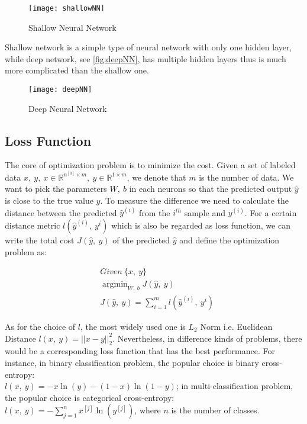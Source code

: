 \begin{figure}[H]
    \centering
    \texttt{[image: shallowNN]}
    \caption{\label{fig:shallowNN}Shallow Neural Network}
\end{figure}

Shallow network is a simple type of neural network with only one hidden layer, 
while deep network, see \autoref{fig:deepNN}, has multiple hidden layers thus is much more complicated than
the shallow one.

\begin{figure}[H]
    \centering
    \texttt{[image: deepNN]}
    \caption{\label{fig:deepNN}Deep Neural Network}
\end{figure}

\subsection{Loss Function}
The core of optimization problem is to minimize the cost. Given a set of labeled
data $ {x,\ y},\ x \in \mathbb{R}^{n^{[0]}\times m}, \ y \in \mathbb{R}^{1\times m} $, 
we denote that $ m $ is the number of data. We want to pick the parameters $ W,\ b $
in each neurons so that the predicted output $ \hat{y} $ is close to the true
value $ y $. To measure the difference we need to calculate the distance between
the predicted $ \hat{y}^{(i)} $ from the $ i^{th} $ sample and $ y^{(i)} $. 
For a certain distance metric $ l(\hat{y}^{(i)},\ y^{i}) $ which is also be regarded
as loss function, we can
write the total cost $ J(\hat{y},\ y) $ of the predicted $ \hat{y} $ and 
define the optimization problem as:

\begin{equation}
    \begin{split}
        & Given\ \{x,\ y\} \\
        & \mathop{\arg\min}_{W,\ b}J(\hat{y},\ y) \\
        & J(\hat{y},\ y) = \sum\limits_{i=1}^{m}l(\hat{y}^{(i)},\ y^{i})
    \end{split} 
\end{equation}

\par As for the choice of $ l $, the most widely used one is $L_2$ Norm 
i.e. Euclidean Distance $ l(x,\ y) = ||x - y||_2^2 $. Nevertheless, in
difference kinds of problems, there would be a corresponding loss function
that has the best performance. For instance, in binary classification problem,
the popular choice is binary cross-entropy: \\
$ l(x,\ y) = - x\ln(y) - (1-x)\ln(1-y) $; in multi-classification problem,
the popular choice is categorical cross-entropy: 
$ l(x,\ y) = - \sum\limits_{j=1}^{n}x^{[j]}\ln(y^{[j]}) $, where $ n $ is the 
number of classes.

